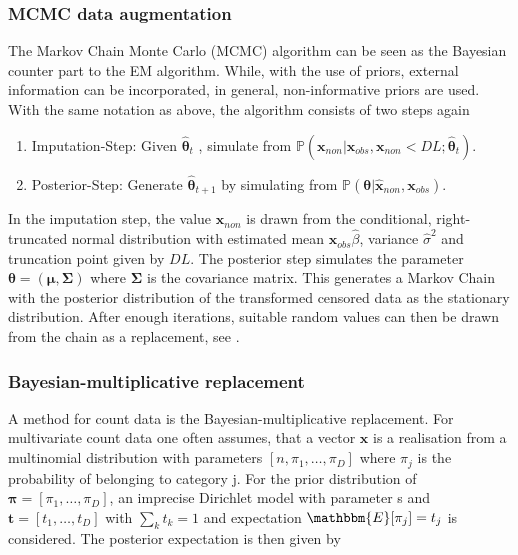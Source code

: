 \subsubsection{MCMC data augmentation}
\label{sec:MCMC data augmentation}

The Markov Chain Monte Carlo (MCMC) algorithm can be seen as the Bayesian counter part to the EM algorithm. While, with the use of priors, external information can be incorporated, in general, non-informative priors are used. With the same notation as above, the algorithm consists of two steps again

\begin{enumerate}
	\item Imputation-Step: Given $\hat{\bm{\theta}}_t$ , simulate from $\mathbb{P}(\bm{x}_{non}|\bm{x}_{obs},\bm{x}_{non} < DL; \hat{\bm{\theta}}_t)$.
	\item Posterior-Step: Generate $\hat{\bm{\theta}}_{t+1}$ by simulating from $\mathbb{P}(\bm{\theta}|\hat{\bm{x}}_{non},\bm{x}_{obs})$. 
\end{enumerate}

In the imputation step, the value $\hat{\bm{x}}_{non}$ is drawn from the conditional, right-truncated normal distribution with estimated mean $\bm{x}_{obs}\hat{\beta}$, variance $\hat{\sigma}^2$ and truncation point given by $DL$. The posterior step simulates the parameter $\bm{\theta}=(\bm{\mu},\bm{\Sigma})$ where $\bm{\Sigma}$ is the covariance matrix. This generates a Markov Chain with the posterior distribution of the transformed censored data as the stationary distribution. After enough iterations, suitable random values can then be drawn from the chain as a replacement, see \textcite{Palarea-Albaladejo:2015}. %


\subsubsection{Bayesian-multiplicative replacement}
\label{sec:Bayesian-multiplicative replacement}

A method for count data is the Bayesian-multiplicative replacement. For multivariate count data one often assumes, that a vector $\bm{x}$ is a realisation from a multinomial distribution with parameters $[n,\pi_1,\ldots,\pi_D]$ where $\pi_j$ is the probability of belonging to category j. For the prior distribution of $\bm{\pi}=[\pi_1,\ldots,\pi_D]$, an imprecise Dirichlet model with parameter s and $\bm{t}=[t_1,\ldots,t_D]$ with $\sum_k t_k=1$ and expectation $\mathbbm{E}[\pi_j]=t_j$ is considered. The posterior expectation is then given by \textcite{Palarea-Albaladejo:2015} 



